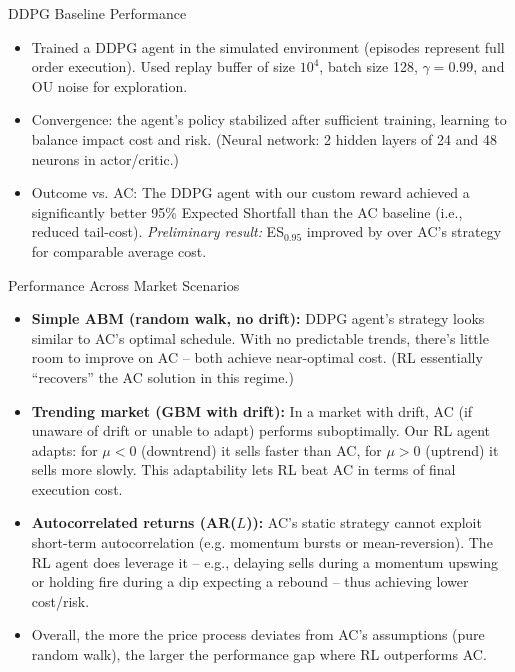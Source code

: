 \documentclass[11pt,aspectratio=169]{beamer}   %
\begin{document}
\begin{frame}{DDPG Baseline Performance}
	\begin{itemize}
		\item Trained a DDPG agent in the simulated environment (episodes represent full order execution). Used replay buffer of size $10^4$, batch size 128, $\gamma=0.99$, and OU noise for exploration.
		\item Convergence: the agent’s policy stabilized after sufficient training, learning to balance impact cost and risk. (Neural network: 2 hidden layers of 24 and 48 neurons in actor/critic.)
		\item Outcome vs. AC: The DDPG agent with our custom reward achieved a significantly better 95\% Expected Shortfall than the AC baseline (i.e., reduced tail-cost). \textit{Preliminary result:} ES$_{0.95}$ improved by over AC’s strategy for comparable average cost.
	\end{itemize}
\end{frame}

\begin{frame}{Performance Across Market Scenarios}
	\begin{itemize}
		\item \textbf{Simple ABM (random walk, no drift):} DDPG agent’s strategy looks similar to AC’s optimal schedule. With no predictable trends, there’s little room to improve on AC – both achieve near-optimal cost. (RL essentially “recovers” the AC solution in this regime.)
		\item \textbf{Trending market (GBM with drift):} In a market with drift, AC (if unaware of drift or unable to adapt) performs suboptimally. Our RL agent adapts: for $\mu<0$ (downtrend) it sells faster than AC, for $\mu>0$ (uptrend) it sells more slowly. This adaptability lets RL beat AC in terms of final execution cost.
		\item \textbf{Autocorrelated returns (AR($L$)):} AC’s static strategy cannot exploit short-term autocorrelation (e.g. momentum bursts or mean-reversion). The RL agent does leverage it – e.g., delaying sells during a momentum upswing or holding fire during a dip expecting a rebound – thus achieving lower cost/risk. 
		\item Overall, the more the price process deviates from AC’s assumptions (pure random walk), the larger the performance gap where RL outperforms AC.
	\end{itemize}
\end{frame}
\end{document}

